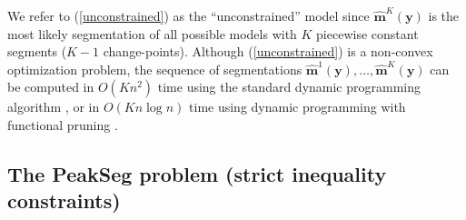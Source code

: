 \documentclass{article}
\begin{document}
We refer to (\ref{unconstrained}) as the ``unconstrained'' model
since $\mathbf{\hat m}^K(\mathbf y)$ is the most likely segmentation
of all possible models with $K$ piecewise constant segments ($K-1$
change-points). 
Although (\ref{unconstrained}) is a non-convex optimization problem,
the sequence of segmentations
$\mathbf{\hat m}^1(\mathbf y), \dots, \mathbf{\hat m}^{K}(\mathbf y)$
can be computed in $O(K n^2)$ time using the standard dynamic
programming algorithm \citep{bellman}, or in $O(K n \log n)$ time
using dynamic programming with functional pruning \citep{pruned-dp,
  johnson, Segmentor}.

\subsection{The PeakSeg problem (strict inequality constraints)}
\label{sec:constrained}
\end{document}
